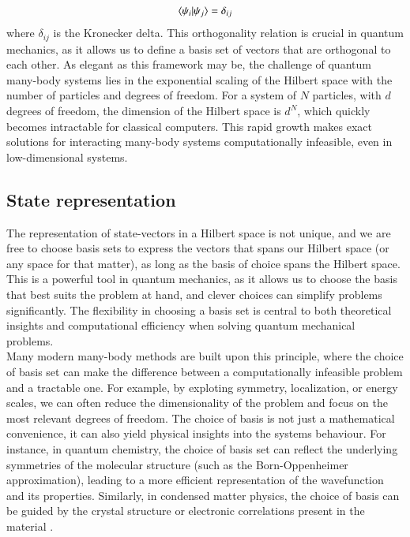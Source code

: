 \documentclass{subfiles}
\begin{document}
\begin{align*}
    \braket{\psi_i|\psi_j} = \delta_{ij}
\end{align*}
where $\delta_{ij}$ is the Kronecker delta. This orthogonality relation is crucial in quantum mechanics, as it allows us to define a basis set of vectors that are orthogonal to each other. As elegant as this framework may be, the challenge of quantum many-body systems lies in the exponential scaling of the Hilbert space with the number of particles and degrees of freedom. For a system of $N$ particles, with $d$ degrees of freedom, the dimension of the Hilbert space is $d^N$, which quickly becomes intractable for classical computers. This rapid growth makes exact solutions for interacting many-body systems computationally infeasible, even in low-dimensional systems.

\subsection{State representation}\label{sec:state_representation}
The representation of state-vectors in a Hilbert space is not unique, and we are free to choose basis sets to express the vectors that spans our Hilbert space (or any space for that matter), as long as the basis of choice spans the Hilbert space\cite{griffiths2018introduction, berera2021quantum}. This is a powerful tool in quantum mechanics, as it allows us to choose the basis that best suits the problem at hand, and clever choices can simplify problems significantly. The flexibility in choosing a basis set is central to both theoretical insights and computational efficiency when solving quantum mechanical problems. \\

Many modern many-body methods are built upon this principle, where the choice of basis set can make the difference between a computationally infeasible problem and a tractable one. For example, by exploting symmetry, localization, or energy scales, we can often reduce the dimensionality of the problem and focus on the most relevant degrees of freedom. The choice of basis is not just a mathematical convenience, it can also yield physical insights into the systems behaviour. For instance, in quantum chemistry, the choice of basis set can reflect the underlying symmetries of the molecular structure (such as the Born-Oppenheimer approximation)\cite{szabo1996modern}, leading to a more efficient representation of the wavefunction and its properties. Similarly, in condensed matter physics, the choice of basis can be guided by the crystal structure or electronic correlations present in the material \cite{baroni2001phonons, kittel2018introduction}. \\
\end{document}
